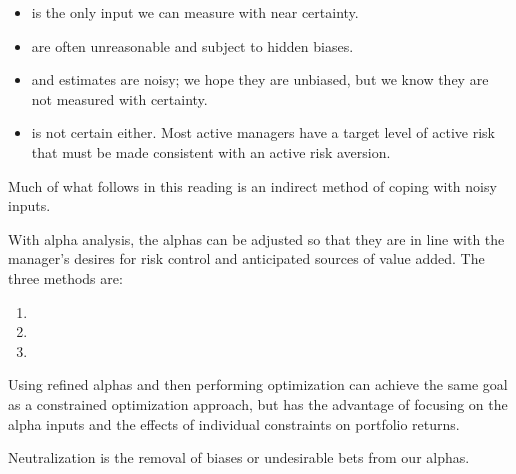 \begin{imkeybox}[title={Only one input is reliable}]
\begin{itemize}
\item {} is the only input we can measure with near
certainty.
\item {} are often unreasonable and subject to hidden biases.
\item {} and  estimates are noisy; we
hope they are unbiased, but we know they are not measured with certainty.
\item {} is not certain either. Most active managers
have a target level of active risk that must be made consistent with an active
risk aversion.
\end{itemize}
Much of what follows in this reading is an indirect method of coping with noisy
inputs.
\end{imkeybox}


With alpha analysis, the alphas can be adjusted so that they are in line with the
manager's desires for risk control and anticipated sources of value added. The
three methods are:

\begin{enumerate}
\item {}
\item {}
\item {}
\end{enumerate}

\begin{imkeybox}
Using refined alphas and then performing optimization can achieve the same goal
as a constrained optimization approach, but has the advantage of focusing on the
alpha inputs and the effects of individual constraints on portfolio returns.
\end{imkeybox}


\begin{imdefbox}[title={Neutralization}]
Neutralization is the removal of biases or undesirable bets from our alphas.
\end{imdefbox}

